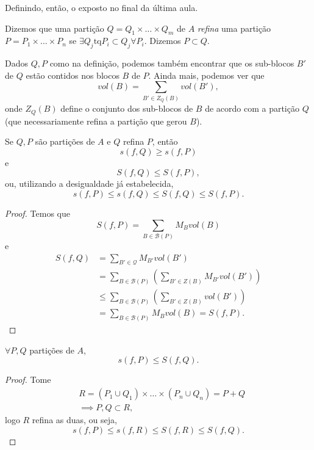 
Definindo, então, o exposto no final da última aula.

\begin{definition}
    Dizemos que uma partição $Q=Q_1\times \ldots\times Q_m$ de $A$ \emph{refina} uma partição $P=P_1\times \ldots\times P_n$ se $\exists Q_j \text{tq} P_i\subset Q_j \forall P_i$. Dizemos $P\subset Q$.
\end{definition}

Dados $Q, P$ como na definição, podemos também encontrar que os sub-blocos $B'$ de $Q$ estão contidos nos blocos $B$ de $P$. Ainda mais, podemos ver que \[
    vol\left( B \right) = \sum_{B' \in Z_Q\left( B \right)  } vol\left( B' \right)
,\] onde $Z_Q\left( B \right) $ define o conjunto dos sub-blocos de $B$ de acordo com a partição $Q$ (que necessariamente refina a partição que gerou $B$).

\begin{prop}
    Se $Q,P$ são partições de $A$ e $Q$ refina $P$, então \[
    s\left( f, Q \right) \ge s\left( f,P \right) 
    \] e \[
    S\left( f,Q \right) \le S\left( f,P \right) 
    ,\] ou, utilizando a desigualdade já estabelecida, \[
     s\left( f,P \right) \le s\left( f, Q \right) \le S\left( f,Q \right) \le S\left( f,P \right) 
    .\] 
\end{prop}
\begin{proof}
    Temos que \[
        S\left( f, P \right) = \sum_{B\in \mathcal{B}\left( P \right) } M_B vol\left( B \right) 
    \] e 
    \begin{align*}
	S\left( f, Q \right) &=\sum_{B'\in \mathcal{Q}} M_{B'} vol\left( B' \right) \\
			     &= \sum_{B\in \mathcal{B}\left( P \right) } \left( 
				 \sum_{B'\in Z\left( B \right) } M_{B'} vol\left( B' \right) 
			     \right) \\
			     &\le \sum_{B\in \mathcal{B}\left( P \right) } \left( 
				 \sum_{B'\in Z\left( B \right) } vol\left( B' \right) 
			     \right) \\
			     &= \sum_{B\in \mathcal{B}\left( P \right) } M_B vol\left( B \right)  = S\left( f, P \right) 
    .\end{align*}
\end{proof}

\begin{corollary}
    $\forall P,Q$ partições de $A$, \[
    s\left( f, P \right) \le S\left( f,Q \right) 
    .\] 
\end{corollary}
\begin{proof}
    Tome
    \begin{align*}
	& R = \left( P_1\cup Q_1 \right) \times \ldots\times \left( P_n\cup Q_n \right) = P + Q \\
	&\implies P,Q \subset R
    ,\end{align*}
    logo $R$ refina as duas, ou seja, \[
    s\left( f,P \right) \le s\left( f,R \right) \le S\left( f,R \right) \le S\left( f,Q \right) 
    .\] 
\end{proof}

